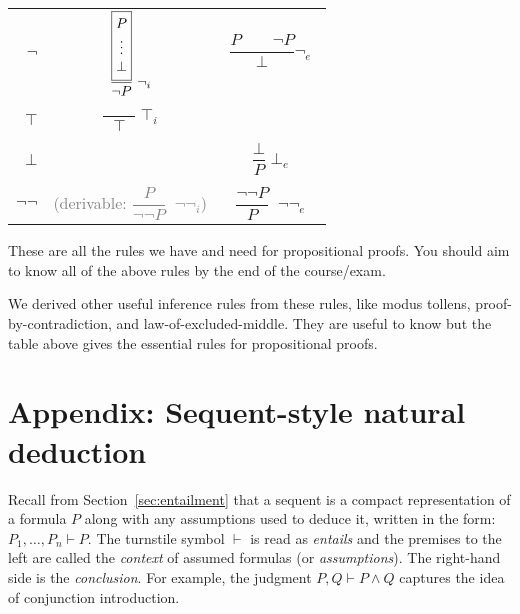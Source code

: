 \begin{longtable}{r||c|c}
  $\neg$
    & \rule{0cm}{2.15cm}
      $\setlength{\arraycolsep}{0em}\dfrac{\fbox{$\begin{array}{c} P
      \\ \vdots \\ \bot\end{array}$}} {\neg P} \; {\neg_i}$
    &
      $\begin{array}{c}\dfrac{P \qquad \neg P}{\bot} {\neg_e}
      \\[3em] \end{array}$ \\[-1.4em]
    & & \\ \hline


  $\top$
    & \rule{0cm}{0.5cm}
      $\dfrac{\qquad}{\top} \; {\top_i}$ \\[-0.4em]
    & & \\ \hline


  $\bot$
    & & \rule{0cm}{0.75cm}
      $\dfrac{\bot}{P} \; {\bot_e}$ \\[-0.4em]
    & & \\ \hline


   $\neg\neg$
    & \rule{0cm}{0.75cm}
      {\textcolor{gray}{(derivable: $\dfrac{P}{\neg \neg P} \;\; {\neg\neg_i}$)}}
    & \rule{0cm}{0.75cm}
      $\dfrac{\neg \neg P}{P} \;\; {\neg\neg_e}$
\end{longtable}

\vspace{0em}

\noindent
These are all the rules we have and need for propositional proofs. You
should aim to know all of the above rules by the end of the
course/exam.

We derived other useful inference rules from these rules, like modus
tollens, proof-by-contradiction, and law-of-excluded-middle. They
are useful to know but the table above gives the essential rules
for propositional proofs.



\section*{Appendix: Sequent-style natural deduction}
\label{app:sequent}

Recall from Section~\ref{sec:entailment} that
a sequent is a compact representation of a formula $P$ along with
any assumptions used to deduce it, written in the form:
$P_1, \ldots, P_n \vdash P$.
The turnstile symbol $\vdash$ is read as \emph{entails} and the premises to the left are
called the \emph{context} of assumed formulas (or \emph{assumptions}). The right-hand side is
the \emph{conclusion}.  For example, the
judgment $P, Q \vdash P \wedge Q$ captures the idea of conjunction introduction.

